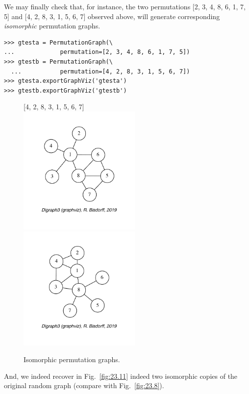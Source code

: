 We may finally check that, for instance, the two permutations [2, 3, 4, 8, 6, 1, 7, 5] and [4, 2, 8, 3, 1, 5, 6, 7] observed above, will generate corresponding \emph{isomorphic} permutation graphs.
\begin{lstlisting}  
>>> gtesta = PermutationGraph(\
...             permutation=[2, 3, 4, 8, 6, 1, 7, 5])
>>> gtestb = PermutationGraph(\
  ...           permutation=[4, 2, 8, 3, 1, 5, 6, 7])
>>> gtesta.exportGraphViz('gtesta')
>>> gtestb.exportGraphViz('gtestb')
\end{lstlisting}
\begin{figure}[h]
  [2, 3, 4, 8, 6, 1, 7, 5]\hfill [4, 2, 8, 3, 1, 5, 6, 7]\\
  \includegraphics[width=6cm]{Figures/23-11-gtesta.pdf}\hfill
  \includegraphics[width=6cm]{Figures/23-11-gtestb.pdf}
\caption{Isomorphic permutation graphs.} 
\label{fig:23.11}       %
\end{figure}
And, we indeed recover in Fig.~\vref{fig:23.11} indeed two isomorphic copies of the original random graph (compare with Fig.~\vref{fig:23.8}).
 
\clearpage


%